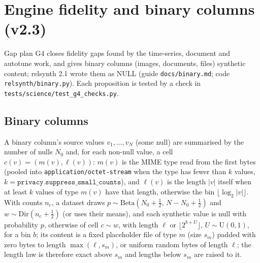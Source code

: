 \section{Engine fidelity and binary columns (v2.3)}\label{sec:g4fidelity}
\setcounter{savedpropgfour}{\value{proposition}}
Gap plan G4 closes fidelity gaps found by the time-series, document and autotune work, and gives binary columns (images, documents, files) synthetic content; relsynth 2.1 wrote them as NULL (guide \texttt{docs/binary.md}; code \texttt{relsynth/binary.py}). Each proposition is tested by a check in \texttt{tests/science/test\_g4\_checks.py}.

\subsection*{Binary columns}
A binary column's source values $v_1,\dots,v_N$ (some null) are summarised by the number of nulls $N_0$ and, for each non-null value, a cell $c(v)=(m(v),\ell(v))$: $m(v)$ is the MIME type read from the first bytes (pooled into \texttt{application/octet-stream} when the type has fewer than $k$ values, $k=\texttt{privacy.suppress\_small\_counts}$), and $\ell(v)$ is the length $|v|$ itself when at least $k$ values of type $m(v)$ have that length, otherwise the bin $\lfloor\log_2|v|\rfloor$. With counts $n_c$, a dataset draws $p\sim\mathrm{Beta}(N_0+\tfrac12,\,N-N_0+\tfrac12)$ and $w\sim\mathrm{Dir}(n_c+\tfrac12)$ (or uses their means), and each synthetic value is null with probability $p$, otherwise of cell $c\sim w$, with length $\ell$ or $\lfloor 2^{b+U}\rfloor$, $U\sim\mathrm{U}(0,1)$, for a bin $b$; its content is a fixed placeholder file of type $m$ (size $s_m$) padded with zero bytes to length $\max(\ell,s_m)$, or uniform random bytes of length $\ell$; the length law is therefore exact above $s_m$ and lengths below $s_m$ are raised to it.

